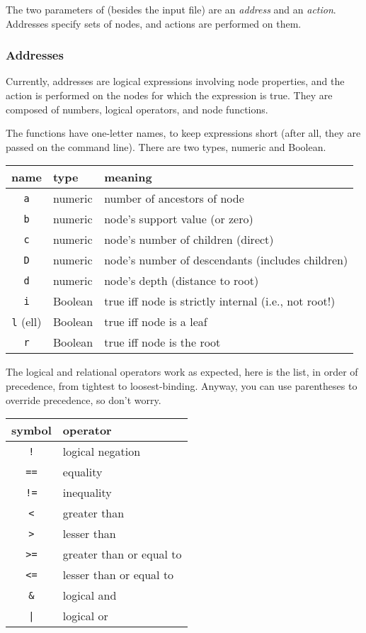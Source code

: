 The two parameters of \ed{} (besides the input file) are an \emph{address} and
an \emph{action}. Addresses specify sets of nodes, and actions are performed on
them. 

\subsubsection{Addresses}

Currently, addresses are logical expressions involving node properties, and the
action is performed on the nodes for which the expression is true. They are
composed of numbers, logical operators, and node functions.

The functions have one-letter names, to keep expressions short (after all, they are passed on the command line). There are two types, numeric and Boolean.

\begin{center}
\begin{tabular}{cll}
name & type & meaning \\
\hline
\texttt{a} & numeric & number of ancestors of node	 \\
\texttt{b} & numeric & node's support value (or zero) \\
\texttt{c} & numeric & node's number of children (direct) \\
\texttt{D} & numeric & node's number of descendants (includes children) \\
\texttt{d} & numeric & node's depth (distance to root) \\
\texttt{i} & Boolean & true iff node is strictly internal (i.e., not root!) \\
\texttt{l} (ell) & Boolean & true iff node is a leaf \\
\texttt{r} & Boolean & true iff node is the root
\end{tabular}
\end{center}

The logical and relational operators work as expected, here is the list, in
order of precedence, from tightest to loosest-binding.  Anyway, you can use
parentheses to override precedence, so don't worry.

\begin{center}
\begin{tabular}{cl}
symbol & operator \\
\hline
\texttt{!} & logical negation \\
\hline
\texttt{==} & equality \\
\texttt{!=} & inequality \\
\texttt{<} & greater than \\
\texttt{>} & lesser than \\
\texttt{>=} & greater than or equal to \\
\texttt{<=} & lesser than or equal to \\
\hline
\texttt{\&} & logical and \\
\hline
\texttt{|} & logical or
\end{tabular}
\end{center}

